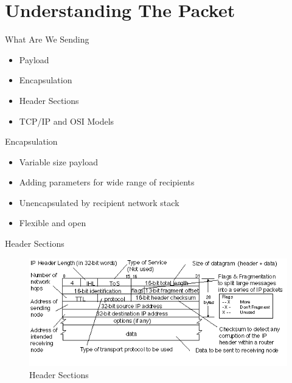 \section{Understanding The Packet}

\begin{frame}
   {What Are We Sending}
      \begin{itemize}
	 \item Payload
         \item Encapsulation
	 \item Header Sections
	 \item TCP/IP and OSI Models
      \end{itemize}


\end{frame}

\cprotect\note{

}

\begin{frame}
   {Encapsulation}
      \begin{itemize}
         \item Variable size payload
	 \item Adding parameters for wide range of recipients
	 \item Unencapsulated by recipient network stack
	 \item Flexible and open
      \end{itemize}


\end{frame}

\cprotect\note{

}

\begin{frame}
   {Header Sections}
      \begin{itemize}
      \begin{figure}[H]
         \includegraphics[width=6.8in]{IMAGES/headersections}
         \caption{Header Sections}
      \end{figure}

      \end{itemize}


\end{frame}

